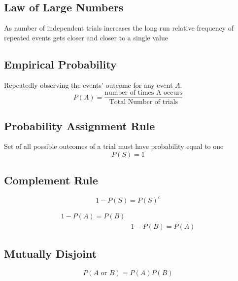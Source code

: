 \documentclass[11pt]{article}
\begin{document}
   \subsection*{Law of Large Numbers}
   As number of independent trials increases the long run relative frequency of repeated events gets closer and closer to a single value
   
   \subsection*{Empirical Probability}
   Repeatedly observing the events' outcome for any event      $A$.
     \begin{equation}
         P(A)= \frac{\text{number of times A occurs}}                {\text{Total Number of trials}}
     \end{equation}
     
    \subsection*{Probability Assignment Rule} 
    Set of all possible outcomes of a trial must have           probability equal to one
        \begin{equation}
            P(S)=1
        \end{equation}
        
     \subsection*{Complement Rule}
         \begin{equation}
             1-P(S)=P(S)^c
         \end{equation}
         
         \begin{equation}
    \begin{split}
    1-P(A)=P(B)\\
    &
    1-P(B)=P(A)
    \end{split}
\end{equation}
         
    \subsection*{Mutually Disjoint}
        \begin{equation}
            P(A\text{ or }B) = P(A)P(B)
        \end{equation}
        
\end{document}
